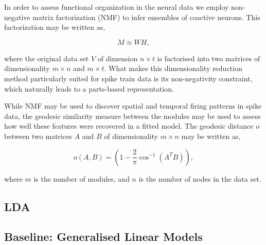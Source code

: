 \documentclass[mphil,deptreport,ianc]{infthesis} %
\begin{document}
In order to assess functional organization in the neural data we employ non-negative matrix factorization (NMF) \cite{Seung1999} to infer ensembles of coactive neurons. 
This factorization may be written as,

\begin{equation}
    M \approx WH,
\end{equation}

where the original data set $V$ of dimension $n \times t$ is factorised into two matrices of dimensionality $m \times n$ and $m \times t$.
What makes this dimensionality reduction method particularly suited for spike train data is its non-negativity constraint, which naturally leads to a parts-based representation. %

While NMF may be used to discover spatial and temporal firing patterns in spike data, the geodesic similarity measure between the modules may be used to assess how well these features were recovered in a fitted model.
The geodesic distance $o$ between two matrices $A$ and $B$ of dimensionality $m \times n$ may be written as,

\begin{equation}
    o(A, B) = (1-\frac{2}{\pi}\cos^{-1}(A^TB)),
\end{equation}

where $m$ is the number of modules, and $n$ is the number of nodes in the data set. 

\subsection{LDA}

\cite{Onken2016a}


\subsection{Baseline: Generalised Linear Models}
\end{document}
